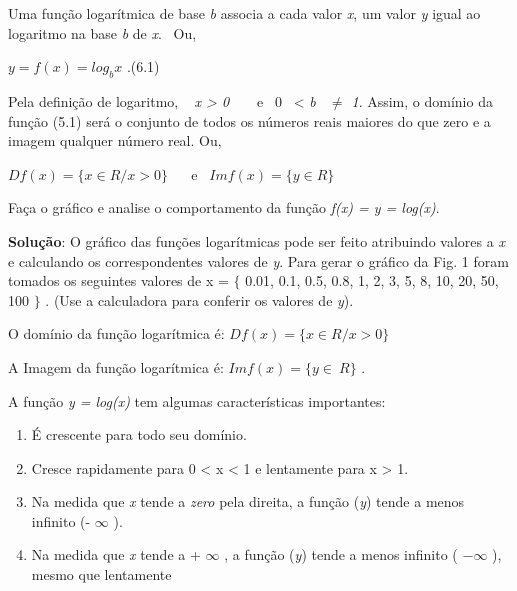 \begin{caixa}
    \begin{tdefinicao}

    Uma função logarítmica de base \textit{b} associa a cada valor \textit{x}, um valor \textit{y} igual ao logaritmo na base \textit{b} de \textit{x}.~ Ou,

    \( y=f \left( x \right) =log_{b}x  \) .\quad \quad \quad \quad \quad \quad (6.1)

    Pela definição de logaritmo, ~  \textit{x > 0}~~~~e~  0~ < \textit{b~ $ \neq $  1}. Assim, o domínio da função (5.1) será o conjunto de todos os números reais maiores do que zero e a imagem qualquer número real. Ou,

    \( Df \left( x \right) = \{ x \in R / x>0 \}  \) ~~ \quad e~ \quad  \( Imf \left( x \right) = \{ y \in R  \}  \) \qedsymbol{}
    \end{tdefinicao}
\end{caixa}

\begin{texemplo}
    Faça o gráfico e analise o comportamento da função \textit{f(x) = y = log(x)}.
    
    \textbf{Solução}: O gráfico das funções logarítmicas pode ser feito atribuindo valores a \textit{x} e calculando os correspondentes valores de \textit{y}. Para gerar o gráfico da Fig. 1 foram tomados os seguintes valores de x = $ \{ $ 0.01, 0.1, 0.5, 0.8, 1, 2, 3, 5, 8, 10, 20, 50, 100 $ \} $ . (Use a calculadora para conferir os valores de \textit{y}).
\end{texemplo}

O domínio da função logarítmica é:  \( Df \left( x \right) = \{ x \in  R / x>0  \}  \) 

A Imagem da função logarítmica é:  \( Imf \left( x \right) = \{ y \in ~R   \}  \) .

A função \textit{y = log(x)} tem algumas características importantes:

\begin{enumerate}
    \item É crescente para todo seu domínio. 

	\item Cresce rapidamente para 0 < x < 1 e lentamente para x > 1. 

	\item Na medida que \textit{x} tende a \textit{zero} pela direita, a função (\textit{y}) tende a menos infinito (-  \( \infty \) ).

	\item Na medida que \textit{x} tende a +  \( \infty \) , a função (\textit{y}) tende a menos infinito (  \( -\infty \) ), mesmo que lentamente\qedsymbol{}
\end{enumerate}

